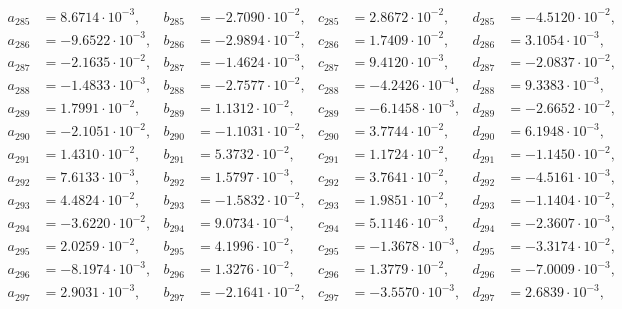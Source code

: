 \begin{align*}
  a_{ 285 } &= 8.6714 \cdot 10^{ -3 }, & b_{ 285 } &= -2.7090 \cdot 10^{ -2 }, & c_{ 285 } &= 2.8672 \cdot 10^{ -2 }, & d_{ 285 } &= -4.5120 \cdot 10^{ -2 }, \\ 
  a_{ 286 } &= -9.6522 \cdot 10^{ -3 }, & b_{ 286 } &= -2.9894 \cdot 10^{ -2 }, & c_{ 286 } &= 1.7409 \cdot 10^{ -2 }, & d_{ 286 } &= 3.1054 \cdot 10^{ -3 }, \\ 
  a_{ 287 } &= -2.1635 \cdot 10^{ -2 }, & b_{ 287 } &= -1.4624 \cdot 10^{ -3 }, & c_{ 287 } &= 9.4120 \cdot 10^{ -3 }, & d_{ 287 } &= -2.0837 \cdot 10^{ -2 }, \\ 
  a_{ 288 } &= -1.4833 \cdot 10^{ -3 }, & b_{ 288 } &= -2.7577 \cdot 10^{ -2 }, & c_{ 288 } &= -4.2426 \cdot 10^{ -4 }, & d_{ 288 } &= 9.3383 \cdot 10^{ -3 }, \\ 
  a_{ 289 } &= 1.7991 \cdot 10^{ -2 }, & b_{ 289 } &= 1.1312 \cdot 10^{ -2 }, & c_{ 289 } &= -6.1458 \cdot 10^{ -3 }, & d_{ 289 } &= -2.6652 \cdot 10^{ -2 }, \\ 
  a_{ 290 } &= -2.1051 \cdot 10^{ -2 }, & b_{ 290 } &= -1.1031 \cdot 10^{ -2 }, & c_{ 290 } &= 3.7744 \cdot 10^{ -2 }, & d_{ 290 } &= 6.1948 \cdot 10^{ -3 }, \\ 
  a_{ 291 } &= 1.4310 \cdot 10^{ -2 }, & b_{ 291 } &= 5.3732 \cdot 10^{ -2 }, & c_{ 291 } &= 1.1724 \cdot 10^{ -2 }, & d_{ 291 } &= -1.1450 \cdot 10^{ -2 }, \\ 
  a_{ 292 } &= 7.6133 \cdot 10^{ -3 }, & b_{ 292 } &= 1.5797 \cdot 10^{ -3 }, & c_{ 292 } &= 3.7641 \cdot 10^{ -2 }, & d_{ 292 } &= -4.5161 \cdot 10^{ -3 }, \\ 
  a_{ 293 } &= 4.4824 \cdot 10^{ -2 }, & b_{ 293 } &= -1.5832 \cdot 10^{ -2 }, & c_{ 293 } &= 1.9851 \cdot 10^{ -2 }, & d_{ 293 } &= -1.1404 \cdot 10^{ -2 }, \\ 
  a_{ 294 } &= -3.6220 \cdot 10^{ -2 }, & b_{ 294 } &= 9.0734 \cdot 10^{ -4 }, & c_{ 294 } &= 5.1146 \cdot 10^{ -3 }, & d_{ 294 } &= -2.3607 \cdot 10^{ -3 }, \\ 
  a_{ 295 } &= 2.0259 \cdot 10^{ -2 }, & b_{ 295 } &= 4.1996 \cdot 10^{ -2 }, & c_{ 295 } &= -1.3678 \cdot 10^{ -3 }, & d_{ 295 } &= -3.3174 \cdot 10^{ -2 }, \\ 
  a_{ 296 } &= -8.1974 \cdot 10^{ -3 }, & b_{ 296 } &= 1.3276 \cdot 10^{ -2 }, & c_{ 296 } &= 1.3779 \cdot 10^{ -2 }, & d_{ 296 } &= -7.0009 \cdot 10^{ -3 }, \\ 
  a_{ 297 } &= 2.9031 \cdot 10^{ -3 }, & b_{ 297 } &= -2.1641 \cdot 10^{ -2 }, & c_{ 297 } &= -3.5570 \cdot 10^{ -3 }, & d_{ 297 } &= 2.6839 \cdot 10^{ -3 }, \\ 

\end{align*}
